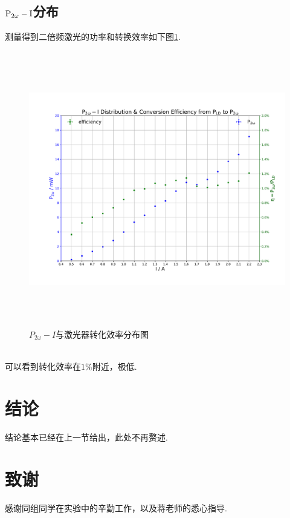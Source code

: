 \documentclass[a4paper]{article}
\begin{document}
\subsection{$\rm{P_{2\omega} - I}$分布}\label{sub:doublefrequency}
测量得到二倍频激光的功率和转换效率如下图\ref{fig:fig5}. 
\begin{figure}[ht]
 \centering
 \includegraphics[height=12cm, width=16cm]{images/phyex5_fig.pdf}
 \caption{$P_{2\omega}-I$与激光器转化效率分布图}
 \label{fig:fig5}
\end{figure}\\
可以看到转化效率在$1\%$附近，极低.


\newpage
\section{结论}\label{conclusions}
结论基本已经在上一节给出，此处不再赘述.\\


\section{致谢}\label{acknowledgments}
感谢同组同学在实验中的辛勤工作，以及蒋老师的悉心指导.
\end{document}

